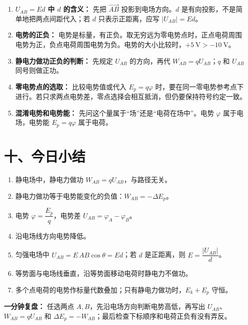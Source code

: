 \begin{mistakebox}
\begin{enumerate}
  \item \textbf{$U_{AB}=Ed$ 中 $d$ 的含义：} 先把
  $\overrightarrow{AB}$ 投影到电场方向。$d$ 是有向投影，不是简单地把两点间距代入；若 $d$ 只表示正距离，应写 $|U_{AB}|=Ed$。

  \item \textbf{电势的正负：} 电势是标量，有正负。取无穷远为零电势点时，正点电荷周围电势为正，负点电荷周围电势为负。电势的大小比较时，$+5\ \mathrm{V} > -10\ \mathrm{V}$。

  \item \textbf{静电力做功正负的判断：} 先规定 $U_{AB}$ 的方向，再代 $W_{AB}=qU_{AB}$；$q$ 和 $U_{AB}$ 同号则做正功。

  \item \textbf{零电势点的选取：} 比较电势值或代入 $E_p=q\varphi$ 时，要在同一零电势参考点下进行。若只求两点电势差，零点选择会相互抵消，但仍要保持符号约定一致。

  \item \textbf{混淆电势和电势能：} 先问这个量属于“场”还是“电荷在场中”。电势 $\varphi$ 属于电场，电势能 $E_p=q\varphi$ 属于电荷。
\end{enumerate}
\end{mistakebox}

\section*{十、今日小结}

\begin{enumerate}
  \item 静电场中，静电力做功 $W_{AB}=qU_{AB}$，与路径无关。
  \item 静电力做功等于电势能变化的负值：$W_{AB}=-\Delta E_p$。
  \item 电势 $\varphi = \dfrac{E_p}{q}$，电势差 $U_{AB} = \varphi_A - \varphi_B$。
  \item 沿电场线方向电势降低。
  \item 匀强电场中
  $U_{AB}=E\,AB\cos\theta=Ed$；若 $d$ 是正距离，则
  $E=\dfrac{|U_{AB}|}{d}$。
  \item 等势面与电场线垂直，沿等势面移动电荷时静电力不做功。
  \item 多个点电荷的电势作标量代数叠加；只有静电力做功时，$E_k+E_p$ 守恒。
\end{enumerate}

\textbf{一分钟复盘：} 任选两点 $A,B$，先沿电场方向判断电势高低，再写出 $U_{AB}$、$W_{AB}=qU_{AB}$ 和 $\Delta E_p=-W_{AB}$；最后检查下标顺序和电荷正负有没有弄反。
